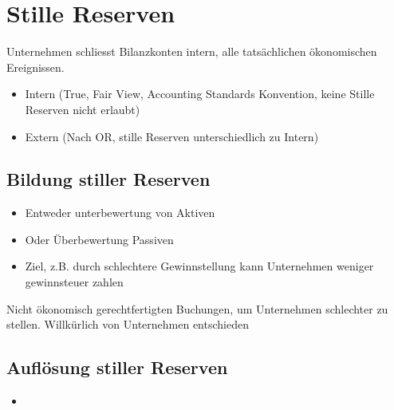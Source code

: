 
\section{Stille Reserven}
Unternehmen schliesst Bilanzkonten intern, alle tatsächlichen ökonomischen Ereignissen. 
\begin{itemize}
    \item Intern (True, Fair View, Accounting Standards Konvention, keine Stille Reserven nicht erlaubt)
    \item Extern (Nach OR, stille Reserven unterschiedlich zu Intern)
\end{itemize}                                                        

\subsection{Bildung stiller Reserven}
\begin{itemize}
    \item Entweder unterbewertung von Aktiven
    \item Oder Überbewertung Passiven
    \item Ziel, z.B. durch schlechtere Gewinnstellung kann Unternehmen weniger gewinnsteuer zahlen 
\end{itemize}
 Nicht ökonomisch gerechtfertigten Buchungen, um Unternehmen schlechter zu stellen. Willkürlich von Unternehmen entschieden
\subsection{Auflösung stiller Reserven}


\begin{itemize}
    \item 
\end{itemize}